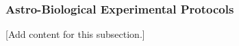 
\subsubsection{Astro-Biological Experimental Protocols}
\label{subsubsec:design_2_6_2_astrobiological_protocols}

[Add content for this subsection.]
